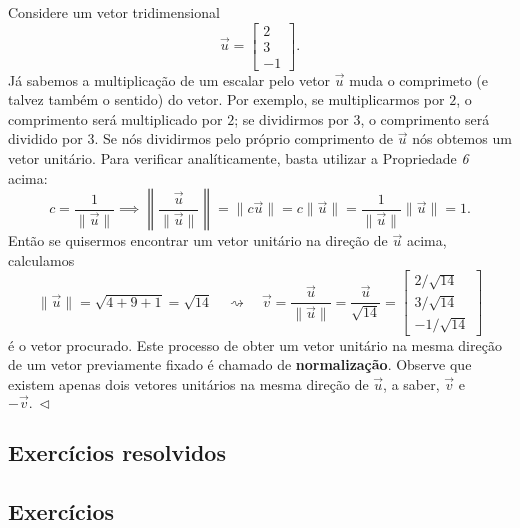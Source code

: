 \documentclass[../livro.tex]{subfiles}  %
\begin{document}
\begin{example}
	Considere um vetor tridimensional
	\begin{equation}
	\vec{u} =
	\begin{bmatrix}
	2 \\ 3 \\ -1
	\end{bmatrix}.
	\end{equation} Já sabemos a multiplicação de um escalar pelo vetor $\vec{u}$ muda o comprimeto (e talvez também o sentido) do vetor. Por exemplo, se multiplicarmos por $2$, o comprimento será multiplicado por $2$; se dividirmos por $3$, o comprimento será dividido por $3$. Se nós dividirmos pelo próprio comprimento de $\vec{u}$ nós obtemos um vetor unitário. Para verificar analíticamente, basta utilizar a Propriedade \textit{6} acima:
	\begin{equation}
	c = \frac{1}{\|\vec{u}\|} \implies \left\| \frac{\vec{u}}{\|\vec{u}\|} \right\| = \|c \vec{u} \| = c \|\vec{u}\| = \frac{1}{\|\vec{u}\|}\|\vec{u}\| = 1.
	\end{equation} Então se quisermos encontrar um vetor unitário na direção de $\vec{u}$ acima, calculamos
	\begin{equation}
	\|\vec{u}\| = \sqrt{4 + 9 + 1} = \sqrt{14} \quad \rightsquigarrow \quad \vec{v} = \frac{\vec{u}}{\|\vec{u}\|} = \frac{\vec{u}}{\sqrt{14}} =
	\begin{bmatrix}
	2/\sqrt{14} \\ 3/\sqrt{14} \\ -1/\sqrt{14}
	\end{bmatrix}
	\end{equation} é o vetor procurado. Este processo de obter um vetor unitário na mesma direção de um vetor previamente fixado é chamado de \textbf{normalização}. Observe que existem apenas dois vetores unitários na mesma direção de $\vec{u}$, a saber, $\vec{v}$ e $- \vec{v}. \ \lhd$
\end{example}

\subsection*{Exercícios resolvidos}

\construirExeresol

\subsection*{Exercícios}

\construirExer
\end{document}
